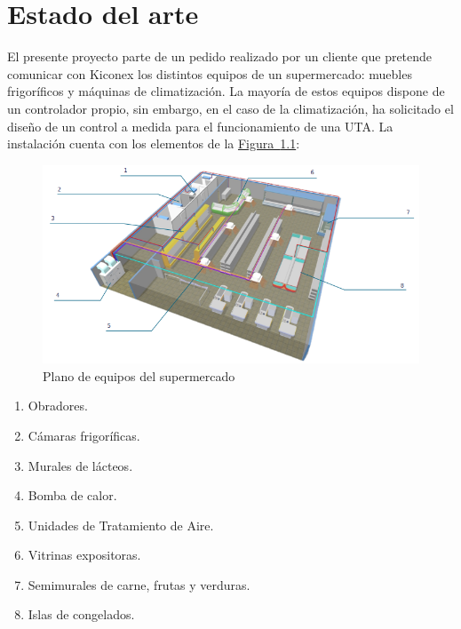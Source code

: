 
\cleardoublepage
\chapter{Estado del arte}

\label{chap:estadoArte} %

El presente proyecto parte de un pedido realizado por un cliente que pretende comunicar con Kiconex los distintos equipos de un supermercado: muebles frigoríficos y máquinas de climatización. La mayoría de estos equipos dispone de un controlador propio, sin embargo, en el caso de la climatización, ha solicitado el diseño de un control a medida para el funcionamiento de una UTA. La instalación cuenta con los elementos de la \hyperref[figura:planoSupermercado]{Figura~\ref{figura:planoSupermercado}}:

\begin{figure}[h]
  \centering
  \includegraphics[width=16cm, keepaspectratio]{img/planoSupermercado}
  \caption{Plano de equipos del supermercado}
  \label{figura:planoSupermercado}
\end{figure}

\begin{enumerate}
  \item Obradores.
  \item Cámaras frigoríficas.
  \item Murales de lácteos.
  \item Bomba de calor.
  \item Unidades de Tratamiento de Aire.
  \item Vitrinas expositoras.
  \item Semimurales de carne, frutas y verduras.
  \item Islas de congelados.
\end{enumerate}

